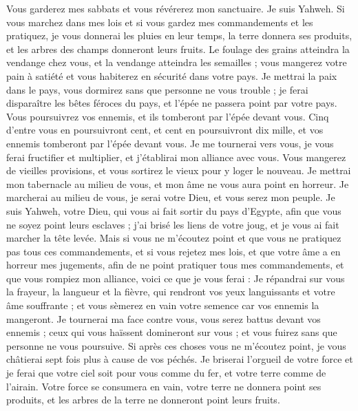 \begin{multicols}{2}
Vous garderez mes sabbats et vous révérerez mon sanctuaire. Je suis Yahweh.
Si vous marchez dans mes lois et si vous gardez mes commandements et les pratiquez,
je vous donnerai les pluies en leur temps, la terre donnera ses produits, et les arbres des champs donneront leurs fruits.
Le foulage des grains atteindra la vendange chez vous, et la vendange atteindra les semailles ; vous mangerez votre pain à satiété et vous habiterez en sécurité dans votre pays.
Je mettrai la paix dans le pays, vous dormirez sans que personne ne vous trouble ; je ferai disparaître les bêtes féroces du pays, et l'épée ne passera point par votre pays.
Vous poursuivrez vos ennemis, et ils tomberont par l'épée devant vous.
Cinq d'entre vous en poursuivront cent, et cent en poursuivront dix mille, et vos ennemis tomberont par l'épée devant vous.
Je me tournerai vers vous, je vous ferai fructifier et multiplier, et j'établirai mon alliance avec vous.
Vous mangerez de vieilles provisions, et vous sortirez le vieux pour y loger le nouveau.
Je mettrai mon tabernacle au milieu de vous, et mon âme ne vous aura point en horreur.
Je marcherai au milieu de vous, je serai votre Dieu, et vous serez mon peuple.
Je suis Yahweh, votre Dieu, qui vous ai fait sortir du pays d'Egypte, afin que vous ne soyez point leurs esclaves ; j'ai brisé les liens de votre joug, et je vous ai fait marcher la tête levée.
Mais si vous ne m'écoutez point et que vous ne pratiquez pas tous ces commandements,
et si vous rejetez mes lois, et que votre âme a en horreur mes jugements, afin de ne point pratiquer tous mes commandements, et que vous rompiez mon alliance,
voici ce que je vous ferai : Je répandrai sur vous la frayeur, la langueur et la fièvre, qui rendront vos yeux languissants et votre âme souffrante ; et vous sèmerez en vain votre semence car vos ennemis la mangeront.
Je tournerai ma face contre vous, vous serez battus devant vos ennemis ; ceux qui vous haïssent domineront sur vous ; et vous fuirez sans que personne ne vous poursuive.
Si après ces choses vous ne m'écoutez point, je vous châtierai sept fois plus à cause de vos péchés.
Je briserai l'orgueil de votre force et je ferai que votre ciel soit pour vous comme du fer, et votre terre comme de l'airain.
Votre force se consumera en vain, votre terre ne donnera point ses produits, et les arbres de la terre ne donneront point leurs fruits.

\end{multicols}

